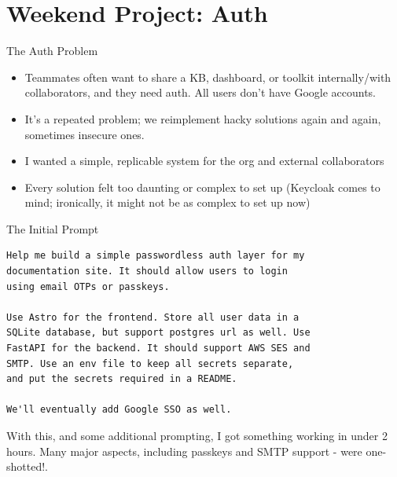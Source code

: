 \documentclass{beamer}
\begin{document}
\section{Weekend Project: Auth}




\begin{frame}{The Auth Problem}
    \begin{itemize}[<+->]
        \item Teammates often want to share a KB, dashboard, or toolkit internally/with collaborators, and they need auth. All users don't have Google accounts.
        \item It's a repeated problem; we reimplement hacky solutions again and again, sometimes insecure ones.
        \item I wanted a simple, replicable system for the org and external collaborators
        \item Every solution felt too daunting or complex to set up (Keycloak comes to mind; ironically, it might not be as complex to set up now)
    \end{itemize}
\end{frame}

\begin{frame}[fragile]{The Initial Prompt}
    \small
    \begin{lstlisting}
Help me build a simple passwordless auth layer for my 
documentation site. It should allow users to login 
using email OTPs or passkeys.

Use Astro for the frontend. Store all user data in a 
SQLite database, but support postgres url as well. Use 
FastAPI for the backend. It should support AWS SES and 
SMTP. Use an env file to keep all secrets separate, 
and put the secrets required in a README.

We'll eventually add Google SSO as well.

    \end{lstlisting}

    \vspace{0.5em}
    \normalsize
    With this, and some additional prompting, I got something working in under 2 hours. Many major aspects, including passkeys and SMTP support - were one-shotted!. 
\end{frame}
\end{document}
